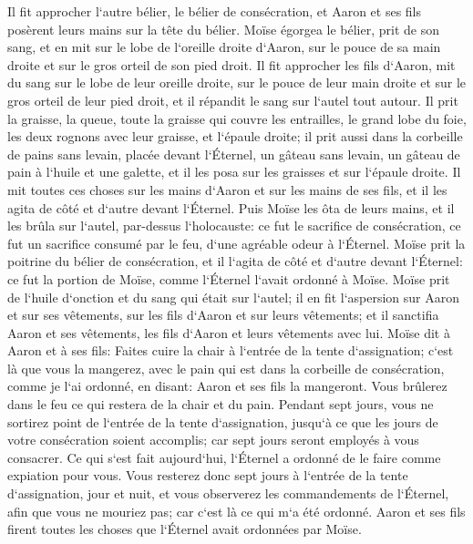 \verse Il fit approcher l`autre bélier, le bélier de consécration, et Aaron et ses fils posèrent leurs mains sur la tête du bélier. 
\verse Moïse égorgea le bélier, prit de son sang, et en mit sur le lobe de l`oreille droite d`Aaron, sur le pouce de sa main droite et sur le gros orteil de son pied droit. 
\verse Il fit approcher les fils d`Aaron, mit du sang sur le lobe de leur oreille droite, sur le pouce de leur main droite et sur le gros orteil de leur pied droit, et il répandit le sang sur l`autel tout autour. 
\verse Il prit la graisse, la queue, toute la graisse qui couvre les entrailles, le grand lobe du foie, les deux rognons avec leur graisse, et l`épaule droite; 
\verse il prit aussi dans la corbeille de pains sans levain, placée devant l`Éternel, un gâteau sans levain, un gâteau de pain à l`huile et une galette, et il les posa sur les graisses et sur l`épaule droite. 
\verse Il mit toutes ces choses sur les mains d`Aaron et sur les mains de ses fils, et il les agita de côté et d`autre devant l`Éternel. 
\verse Puis Moïse les ôta de leurs mains, et il les brûla sur l`autel, par-dessus l`holocauste: ce fut le sacrifice de consécration, ce fut un sacrifice consumé par le feu, d`une agréable odeur à l`Éternel. 
\verse Moïse prit la poitrine du bélier de consécration, et il l`agita de côté et d`autre devant l`Éternel: ce fut la portion de Moïse, comme l`Éternel l`avait ordonné à Moïse. 
\verse Moïse prit de l`huile d`onction et du sang qui était sur l`autel; il en fit l`aspersion sur Aaron et sur ses vêtements, sur les fils d`Aaron et sur leurs vêtements; et il sanctifia Aaron et ses vêtements, les fils d`Aaron et leurs vêtements avec lui. 
\verse Moïse dit à Aaron et à ses fils: Faites cuire la chair à l`entrée de la tente d`assignation; c`est là que vous la mangerez, avec le pain qui est dans la corbeille de consécration, comme je l`ai ordonné, en disant: Aaron et ses fils la mangeront. 
\verse Vous brûlerez dans le feu ce qui restera de la chair et du pain. 
\verse Pendant sept jours, vous ne sortirez point de l`entrée de la tente d`assignation, jusqu`à ce que les jours de votre consécration soient accomplis; car sept jours seront employés à vous consacrer. 
\verse Ce qui s`est fait aujourd`hui, l`Éternel a ordonné de le faire comme expiation pour vous. 
\verse Vous resterez donc sept jours à l`entrée de la tente d`assignation, jour et nuit, et vous observerez les commandements de l`Éternel, afin que vous ne mouriez pas; car c`est là ce qui m`a été ordonné. 
\verse Aaron et ses fils firent toutes les choses que l`Éternel avait ordonnées par Moïse. 

